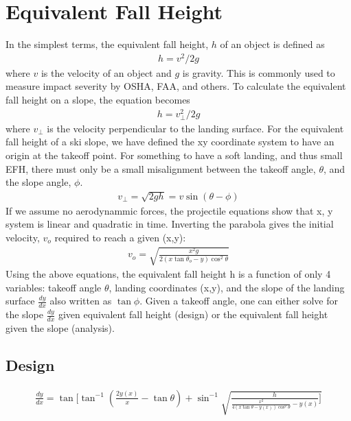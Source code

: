\documentclass{article}
\begin{document}
\section{Equivalent Fall Height}
%
In the simplest terms, the equivalent fall height, $h$ of an object is defined as
\begin{align}
  h = v^2/2g
  \label{eq:efh_general}
\end{align}
where $v$ is the velocity of an object and $g$ is gravity. This is commonly used to measure impact severity by OSHA, FAA, and others. To calculate the equivalent fall height on a slope, the equation becomes
\begin{align}
  h = v_{\perp}^2/2g
  \label{eq:efh_slope}
\end{align}
where $v_{\perp}$ is the velocity perpendicular to the landing surface. For the equivalent fall height of a ski slope, we have defined the xy coordinate system to have an origin at the takeoff point. For something to have a soft landing, and thus small EFH, there must only be a small misalignment between the takeoff angle, $\theta$, and the slope angle, $\phi$. 
\begin{align}
    v_{\perp} = \sqrt{2gh} = v\sin(\theta - \phi)
\end{align}
If we assume no aerodynammic forces, the projectile equations show that x, y system is linear and quadratic in time. Inverting the parabola gives the initial velocity, $v_o$ required to reach a given (x,y):
\begin{align}
    v_o = \sqrt{\frac{x^2g}{2(x \tan \theta_o -y)\cos^{2}\theta}}
\end{align}
Using the above equations, the equivalent fall height h is a function of only 4 variables: takeoff angle $\theta$, landing coordinates (x,y), and the slope of the landing surface $\frac{dy}{dx}$ also written as $\tan\phi$. Given a takeoff angle, one can either solve for the slope $\frac{dy}{dx}$ given equivalent fall height (design) or the equivalent fall height given the slope (analysis).

\subsection{Design}

\begin{align}
    \frac{dy}{dx} = \tan[\tan^{-1}(\frac{2y(x)}{x}- \tan\theta)+ \sin^{-1}\sqrt{\frac{h}{\frac{x^2}{4(x\tan\theta-y(x))\cos^{2}\theta}-y(x)}]}
\end{align}
\end{document}
